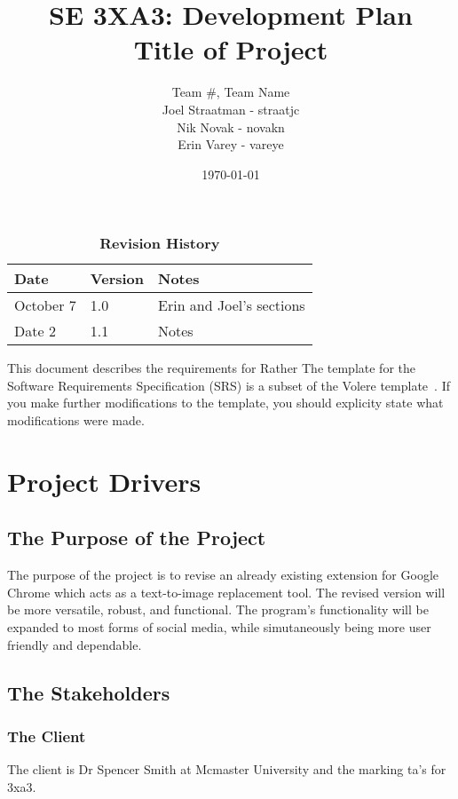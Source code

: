\documentclass[12pt, titlepage]{article}
\title{SE 3XA3: Development Plan\\Title of Project}
\author{Team \#, Team Name
		\\ Joel Straatman - straatjc
		\\ Nik Novak - novakn
		\\ Erin Varey - vareye
}
\date{\today}
\begin{document}
\maketitle

\tableofcontents
\listoftables
\listoffigures

\begin{table}[bp]
\caption{\bf Revision History}
\begin{tabularx}{\textwidth}{p{3cm}p{2cm}X}
\toprule {\bf Date} & {\bf Version} & {\bf Notes}\\
\midrule
October 7 & 1.0 &  Erin and Joel's sections\\
Date 2 & 1.1 & Notes\\
\bottomrule
\end{tabularx}
\end{table}

\newpage


This document describes the requirements for Rather  The template for the Software
Requirements Specification (SRS) is a subset of the Volere
template~\citep{RobertsonAndRobertson2012}.  If you make further modifications
to the template, you should explicity state what modifications were made.

\section{Project Drivers}

\subsection{The Purpose of the Project}
The purpose of the project is to revise an already existing extension for Google Chrome which acts as a text-to-image replacement tool. The revised version will be more versatile, robust, and functional. The program's functionality will be expanded to most forms of social media, while simutaneously being more user friendly and dependable. 

\subsection{The Stakeholders}

\subsubsection{The Client}
The client is Dr Spencer Smith at Mcmaster University and the marking ta's for 3xa3. 
\end{document}

